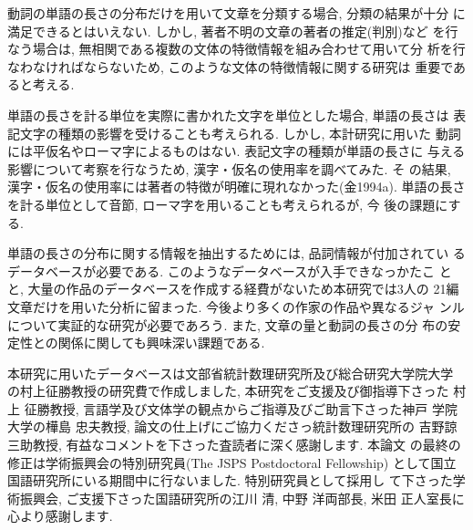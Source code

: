 動詞の単語の長さの分布だけを用いて文章を分類する場合, 分類の結果が十分
に満足できるとはいえない. しかし, 著者不明の文章の著者の推定(判別)など
を行なう場合は, 無相関である複数の文体の特徴情報を組み合わせて用いて分
析を行なわなければならないため, このような文体の特徴情報に関する研究は
重要であると考える. 

単語の長さを計る単位を実際に書かれた文字を単位とした場合, 単語の長さは
表記文字の種類の影響を受けることも考えられる. しかし, 本計研究に用いた
動詞には平仮名やローマ字によるものはない. 表記文字の種類が単語の長さに
与える影響について考察を行なうため, 漢字・仮名の使用率を調べてみた. そ
の結果, 漢字・仮名の使用率には著者の特徴が明確に現れなかった(金1994a). 
単語の長さを計る単位として音節, ローマ字を用いることも考えられるが, 今
後の課題にする. 

単語の長さの分布に関する情報を抽出するためには, 品詞情報が付加されてい
るデータベースが必要である. このようなデータベースが入手できなっかたこ
とと, 大量の作品のデータベースを作成する経費がないため本研究では3人の
21編文章だけを用いた分析に留まった. 今後より多くの作家の作品や異なるジャ
ンルについて実証的な研究が必要であろう. また, 文章の量と動詞の長さの分
布の安定性との関係に関しても興味深い課題である.


\acknowledgment

本研究に用いたデータベースは文部省統計数理研究所及び総合研究大学院大学
の村上征勝教授の研究費で作成しました, 本研究をご支援及び御指導下さった
村上 征勝教授, 言語学及び文体学の観点からご指導及びご助言下さった神戸
学院大学の樺島 忠夫教授, 論文の仕上げにご協力くださっ統計数理研究所の
吉野諒三助教授, 有益なコメントを下さった査読者に深く感謝します. 本論文
の最終の修正は学術振興会の特別研究員(The JSPS Postdoctoral Fellowship)
として国立国語研究所にいる期間中に行ないました. 特別研究員として採用し
て下さった学術振興会, ご支援下さった国語研究所の江川 清, 中野 洋両部長, 
米田 正人室長に心より感謝します. 







\begin{biography}


\end{biography}


